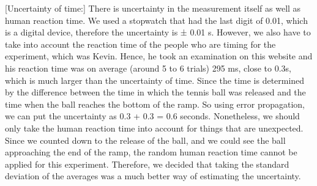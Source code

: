 \documentclass[12pt]{report}
\begin{document}
[Uncertainty of time:] There is uncertainty in the measurement itself as well as human reaction time. We used a stopwatch that had the last digit of 0.01, which is a digital device, therefore the uncertainty is ± 0.01 s. However, we also have to take into account the reaction time of the people who are timing for the experiment, which was Kevin. Hence, he took an examination on this website and his reaction time was on average (around 5 to 6 trials) 295 ms, close to 0.3s, which is much larger than the uncertainty of time. Since the time is determined by the difference between the time in which the tennis ball was released and the time when the ball reaches the bottom of the ramp. So using error propagation, we can put the uncertainty as 0.3 + 0.3 = 0.6 seconds. Nonetheless, we should only take the human reaction time into account for things that are unexpected. Since we counted down to the release of the ball, and we could see the ball approaching the end of the ramp, the random human reaction time cannot be applied for this experiment. Therefore, we decided that taking the standard deviation of the averages was a much better way of estimating the uncertainty.
\end{document}
